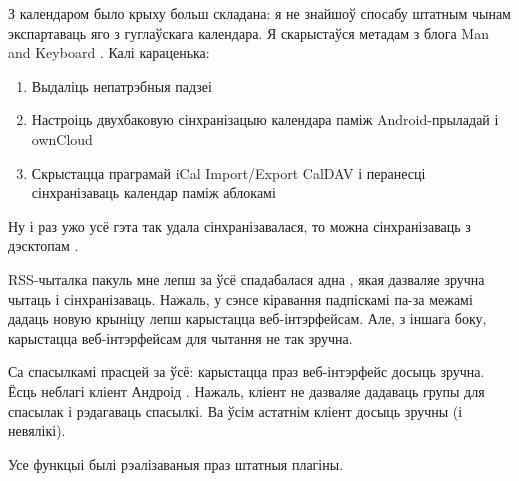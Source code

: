 \documentclass[10pt, a5paper]{article}
\begin{document}
З календаром было крыху больш складана: я не знайшоў спосабу штатным чынам экспартаваць яго з гуглаўскага календара. Я скарыстаўся метадам з блога Man and Keyboard \cite{zahar9}. Калі караценька:

\begin{enumerate}
  \item Выдаліць непатрэбныя падзеі
  \item Настроіць двухбаковую сінхранізацыю календара паміж \linebreak Android-прыладай і ownCloud
  \item Скрыстацца праграмай iCal Import/Export CalDAV \cite{zahar10} і перанесці сінхранізаваць календар паміж аблокамі
\end{enumerate}

Ну і раз ужо усё гэта так удала сінхранізавалася, то можна сінхранізаваць з дэсктопам \cite{zahar12, zahar13}.

RSS-чыталка пакуль мне лепш за ўсё спадабалася адна  \cite{zahar14}, якая дазваляе зручна чытаць і сінхранізаваць. Нажаль, у сэнсе кіравання падпіскамі па-за межамі дадаць новую крыніцу лепш карыстацца веб-інтэрфейсам. Але, з іншага боку, карыстацца веб-інтэрфейсам для чытання не так зручна.

Са спасылкамі прасцей за ўсё: карыстацца праз веб-інтэрфейс досыць зручна. Ёсць неблагі кліент Андроід \cite{zahar15}. Нажаль, кліент не дазваляе дадаваць групы для спасылак і рэдагаваць спасылкі. Ва ўсім астатнім кліент досыць зручны (і невялікі).

Усе функцыі былі рэалізаваныя праз штатныя плагіны.
\end{document}
